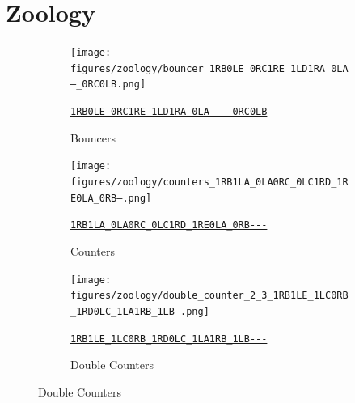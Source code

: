\documentclass[a4paper,british]{article}
\theoremstyle{definition} %
\numberwithin{equation}{section}
\theoremstyle{definition} %
\newcommand{\tm}[1]{\href{https://bbchallenge.org/#1}{\texttt{\nolinkurl{#1}}}}
\begin{document}
\section{Zoology}\label{sec:zoo}
\vspace{-1em}
\begin{figure}[htbp]
    \centering

    \begin{subfigure}{0.3\textwidth}
        \centering
        \texttt{[image: figures/zoology/bouncer\_1RB0LE\_0RC1RE\_1LD1RA\_0LA---\_0RC0LB.png]}
        \caption*{Bouncers}
        {\scriptsize \tm{1RB0LE_0RC1RE_1LD1RA_0LA---_0RC0LB}}
    \end{subfigure}
    \hfill
    \begin{subfigure}{0.3\textwidth}
        \centering
        \texttt{[image: figures/zoology/counters\_1RB1LA\_0LA0RC\_0LC1RD\_1RE0LA\_0RB---.png]}
        \caption*{Counters}
        {\scriptsize \tm{1RB1LA_0LA0RC_0LC1RD_1RE0LA_0RB---}}
    \end{subfigure}
    \hfill
    \begin{subfigure}{0.3\textwidth}
        \centering
        \texttt{[image: figures/zoology/double\_counter\_2\_3\_1RB1LE\_1LC0RB\_1RD0LC\_1LA1RB\_1LB---.png]}
        \caption*{Double Counters}
        {\scriptsize \tm{1RB1LE_1LC0RB_1RD0LC_1LA1RB_1LB---}}
    \end{subfigure}

    \vspace{0.5cm}


\end{figure}
\end{document}
